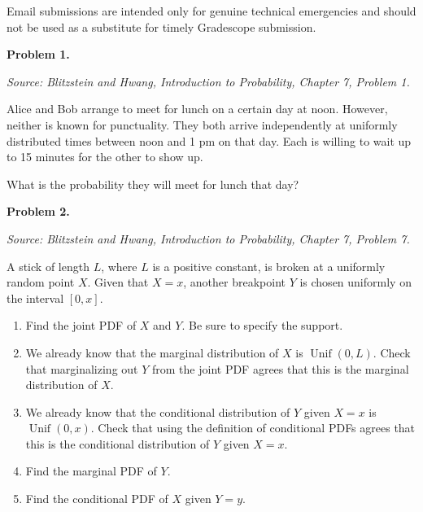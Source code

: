 \documentclass[11pt]{article}
\newcommand{\source}[2]{%
    \vspace{0.15cm}
    {\small\textit{Source: Blitzstein and Hwang, \textit{Introduction to Probability}, Chapter #1, Problem #2.}}
}
\begin{document}
Email submissions are intended only for genuine technical emergencies and should not be used as a substitute for timely Gradescope submission.

\newpage

\begin{problemheader}
\textbf{Problem 1.  }
\end{problemheader}
\source{7}{1}

Alice and Bob arrange to meet for lunch on a certain day at noon. However, neither is known for punctuality. They both arrive independently at uniformly distributed times between noon and 1 pm on that day. Each is willing to wait up to 15 minutes for the other to show up.

What is the probability they will meet for lunch that day?

\newpage


\begin{problemheader}
\textbf{Problem 2.  }
\end{problemheader}
\source{7}{7}

A stick of length $L$, where $L$ is a positive constant, is broken at a uniformly random point $X$. Given that $X=x$, another breakpoint $Y$ is chosen uniformly on the interval $[0,x]$.

\begin{enumerate}[label=(\alph*), leftmargin=*]
    \item Find the joint PDF of $X$ and $Y$. Be sure to specify the support.

    \item We already know that the marginal distribution of $X$ is $\operatorname{Unif}(0,L)$. Check that marginalizing out $Y$ from the joint PDF agrees that this is the marginal distribution of $X$.

    \item We already know that the conditional distribution of $Y$ given $X=x$ is $\operatorname{Unif}(0,x)$. Check that using the definition of conditional PDFs agrees that this is the conditional distribution of $Y$ given $X=x$.

    \item Find the marginal PDF of $Y$.

    \item Find the conditional PDF of $X$ given $Y=y$.
\end{enumerate}
\end{document}
